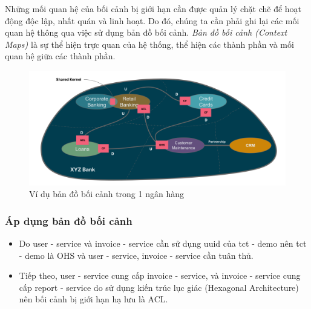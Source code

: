 Những mối quan hệ của bối cảnh bị giới hạn cần được quản lý chặt chẽ để hoạt động độc lập, nhất quán và linh hoạt. Do đó, chúng ta cần phải ghi lại các mối quan hệ thông qua việc sử dụng bản đồ bối cảnh. \emph{Bản đồ bối cảnh (Context Maps)} là sự thể hiện trực quan của hệ thống, thể hiện các thành phần và mối quan hệ giữa các thành phần.

\begin{figure}[H]

\centering

\includegraphics[scale = 0.4]{pictures/_vi_du_ban_do_boi_canh_trong_1_ngan_hang/main.drawio.png}

\caption{Ví dụ bản đồ bối cảnh trong 1 ngân hàng}

\end{figure}

\subsubsection{Áp dụng bản đồ bối cảnh}

\begin{itemize}

\item Do user - service và invoice - service cần sử dụng uuid của tct - demo nên tct - demo là OHS và user - service, invoice - service cần tuân thủ.

\item Tiếp theo, user - service cung cấp invoice - service, và invoice - service cung cấp report - service do sử dụng kiến trúc lục giác (Hexagonal Architecture) nên bối cảnh bị giới hạn hạ lưu là ACL.

\end{itemize}

